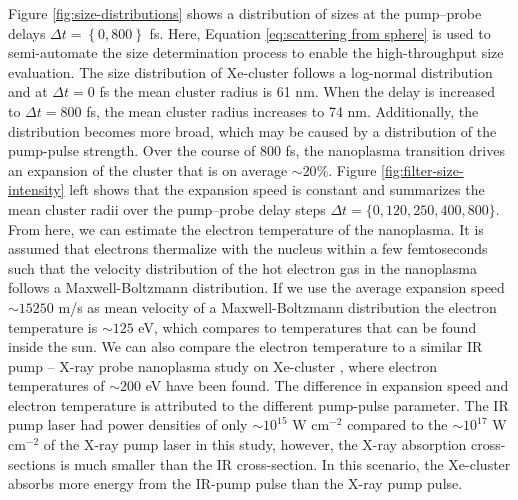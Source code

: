 Figure \ref{fig:size-distributions} shows a distribution of sizes at the pump--probe delays $\Delta t = \left\{0,800\right\}$ fs. Here, Equation \eqref{eq:scattering from sphere} is used to semi-automate the size determination process to enable the high-throughput size evaluation. The size distribution of Xe-cluster follows a log-normal distribution \citep{Schutte-2002-IJMS} and at $\Delta t=0$ fs the mean cluster radius is 61 nm. When the delay is increased to $\Delta t=800$ fs, the mean cluster radius increases to 74 nm. Additionally, the distribution becomes more broad, which may be caused by a distribution of the pump-pulse strength. Over the course of 800 fs, the nanoplasma transition drives an expansion of the cluster that is on average $\sim 20 \%$. Figure \ref{fig:filter-size-intensity} left shows that the expansion speed is constant and summarizes the mean cluster radii over the pump--probe delay steps $\Delta t=\{0,120,250,400,800\}$. From here, we can estimate the electron temperature of the nanoplasma. It is assumed that electrons thermalize with the nucleus within a few femtoseconds such that the velocity distribution of the hot electron gas in the nanoplasma follows a Maxwell-Boltzmann distribution. If we use the average expansion speed $\sim 15250$ m/s as mean velocity of a Maxwell-Boltzmann distribution the electron temperature is $\sim 125$ eV, which compares to temperatures that can be found inside the sun. We can also compare the electron temperature to a similar IR pump -- X-ray probe nanoplasma study on Xe-cluster \citep{Gorkhover-2016-NatPho}, where electron temperatures of $\sim 200$ eV have been found. The difference in expansion speed and electron temperature is attributed to the different pump-pulse parameter. The IR pump laser had power densities of only $\sim 10^{15}$ W cm$^{-2}$ compared to the $\sim 10^{17}$ W cm$^{-2}$ of the X-ray pump laser in this study, however, the X-ray absorption cross-sections is much smaller than the IR cross-section. In this scenario, the Xe-cluster absorbs more energy from  the IR-pump pulse than the X-ray pump pulse.\\
